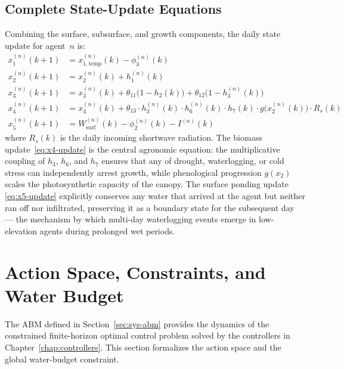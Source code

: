 \subsection{Complete State-Update Equations}
\label{ssec:sys-update}

Combining the surface, subsurface, and growth components, the daily
state update for agent~$n$ is:
\begin{align}
x_1^{(n)}(k+1) &= x_{1,\mathrm{temp}}^{(n)}(k) - \phi_3^{(n)}(k) \label{eq:x1-update}\\
x_2^{(n)}(k+1) &= x_2^{(n)}(k) + h_1^{(n)}(k) \label{eq:x2-update}\\
x_3^{(n)}(k+1) &= x_3^{(n)}(k) + \theta_{11}\bigl(1 - h_2(k)\bigr)
                                   + \theta_{12}\bigl(1 - h_3^{(n)}(k)\bigr) \label{eq:x3-update}\\
x_4^{(n)}(k+1) &= x_4^{(n)}(k) + \theta_{13} \cdot h_3^{(n)}(k) \cdot
                                   h_6^{(n)}(k) \cdot h_7(k) \cdot
                                   g\bigl(x_2^{(n)}(k)\bigr) \cdot R_s(k) \label{eq:x4-update}\\
x_5^{(n)}(k+1) &= W_{\mathrm{surf}}^{(n)}(k) - \phi_2^{(n)}(k) - I^{(n)}(k) \label{eq:x5-update}
\end{align}
where $R_s(k)$ is the daily incoming shortwave radiation. The biomass
update~\eqref{eq:x4-update} is the central agronomic equation: the
multiplicative coupling of $h_3$, $h_6$, and $h_7$ ensures that any
of drought, waterlogging, or cold stress can independently arrest
growth, while phenological progression $g(x_2)$ scales the
photosynthetic capacity of the canopy. The surface ponding update
\eqref{eq:x5-update} explicitly conserves any water that arrived at
the agent but neither ran off nor infiltrated, preserving it as a
boundary state for the subsequent day --- the mechanism by which
multi-day waterlogging events emerge in low-elevation agents during
prolonged wet periods.

\section{Action Space, Constraints, and Water Budget}
\label{sec:sys-control}

The ABM defined in Section~\ref{sec:sys-abm} provides the dynamics of
the constrained finite-horizon optimal control problem solved by the
controllers in Chapter~\ref{chap:controllers}. This section formalizes
the action space and the global water-budget constraint.

